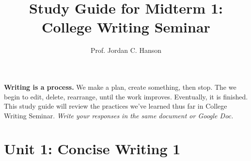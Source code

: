 \documentclass{article}
\begin{document}
\title{Study Guide for Midterm 1: College Writing Seminar}
\author{Prof. Jordan C. Hanson}

\maketitle

\textbf{Writing is a process.}  We make a plan, create something, then stop.  The we begin to edit, delete, rearrange, until the work improves.  Eventually, it is finished.  This study guide will review the practices we've learned thus far in College Writing Seminar.  \textit{Write your responses in the same document or Google Doc.}

\section{Unit 1: Concise Writing 1}
\end{document}
